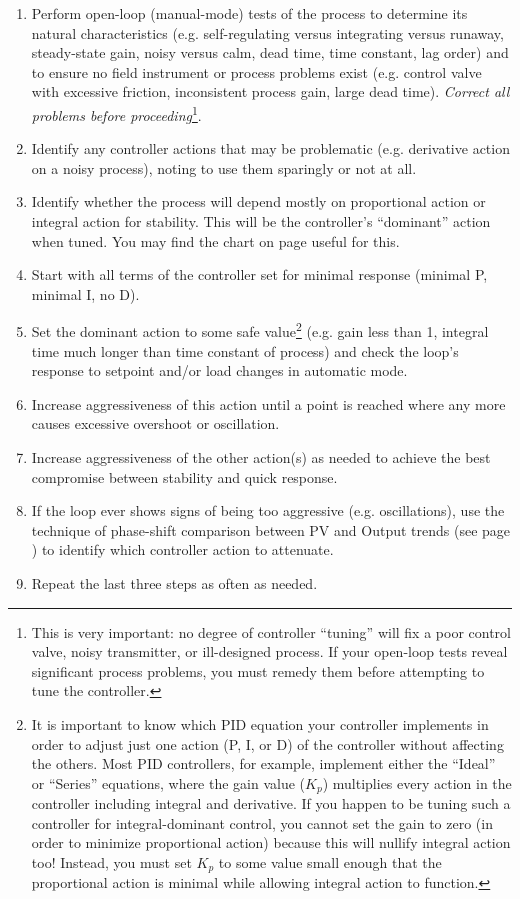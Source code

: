 \begin{enumerate}
\item Perform open-loop (manual-mode) tests of the process to determine its natural characteristics (e.g. self-regulating versus integrating versus runaway, steady-state gain, noisy versus calm, dead time, time constant, lag order) and to ensure no field instrument or process problems exist (e.g. control valve with excessive friction, inconsistent process gain, large dead time).  \textit{Correct all problems before proceeding}\footnote{This is very important: no degree of controller ``tuning'' will fix a poor control valve, noisy transmitter, or ill-designed process.  If your open-loop tests reveal significant process problems, you must remedy them before attempting to tune the controller.}.
\item Identify any controller actions that may be problematic (e.g. derivative action on a noisy process), noting to use them sparingly or not at all.
\item Identify whether the process will depend mostly on proportional action or integral action for stability.  This will be the controller's ``dominant'' action when tuned.  You may find the chart on page \pageref{tuning_recommendations} useful for this.
\item Start with all terms of the controller set for minimal response (minimal P, minimal I, no D).
\item Set the dominant action to some safe value\footnote{It is important to know which PID equation your controller implements in order to adjust just one action (P, I, or D) of the controller without affecting the others.  Most PID controllers, for example, implement either the ``Ideal'' or ``Series'' equations, where the gain value ($K_p$) multiplies every action in the controller including integral and derivative.  If you happen to be tuning such a controller for integral-dominant control, you cannot set the gain to zero (in order to minimize proportional action) because this will nullify integral action too!  Instead, you must set $K_p$ to some value small enough that the proportional action is minimal while allowing integral action to function.} (e.g. gain less than 1, integral time much longer than time constant of process) and check the loop's response to setpoint and/or load changes in automatic mode.
\item Increase aggressiveness of this action until a point is reached where any more causes excessive overshoot or oscillation. 
\item Increase aggressiveness of the other action(s) as needed to achieve the best compromise between stability and quick response.
\item If the loop ever shows signs of being too aggressive (e.g. oscillations), use the technique of phase-shift comparison between PV and Output trends (see page \pageref{overtune_phaseshift}) to identify which controller action to attenuate.
\item Repeat the last three steps as often as needed.
\end{enumerate}

